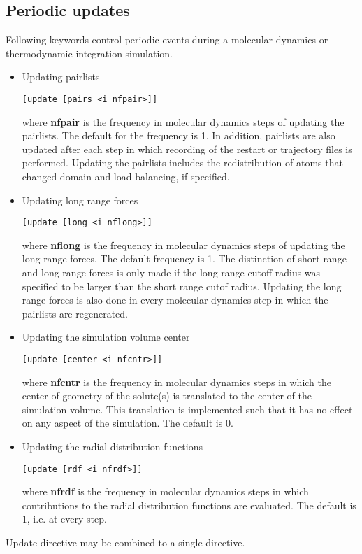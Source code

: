 \subsection{Periodic updates}
Following keywords control periodic events during a molecular
dynamics or thermodynamic integration simulation.
\begin{itemize}
\item
Updating pairlists
\begin{verbatim}
[update [pairs <i nfpair>]]
\end{verbatim}
where {\bf nfpair} is the frequency in molecular dynamics steps of 
updating the pairlists. The default for the frequency is 1.
In addition, pairlists are also updated after each step in which
recording of the restart or trajectory files is performed. Updating
the pairlists includes the redistribution of atoms that changed
domain and load balancing, if specified.
\item
Updating long range forces
\begin{verbatim}
[update [long <i nflong>]]
\end{verbatim}
where {\bf nflong} is the frequency in molecular dynamics steps 
of updating the long range forces. The default frequency is 1.
The distinction of short range and long range forces is only
made if the long range cutoff radius was specified to be larger
than the short range cutof radius. Updating the long range forces
is also done in every molecular dynamics step in which the
pairlists are regenerated.
\item
Updating the simulation volume center
\begin{verbatim}
[update [center <i nfcntr>]]
\end{verbatim}
where {\bf nfcntr} is the frequency in molecular dynamics steps in 
which the center of geometry of the solute(s) is translated to the
center of the simulation volume. This translation is implemented
such that it has no effect on any aspect of the simulation. The
default is 0.
\item
Updating the radial distribution functions
\begin{verbatim}
[update [rdf <i nfrdf>]]
\end{verbatim}
where {\bf nfrdf} is the frequency in molecular dynamics steps in 
which contributions to the radial distribution functions are
evaluated. The default is 1, i.e. at every step.
\end{itemize}
Update directive may be combined to a single directive.
